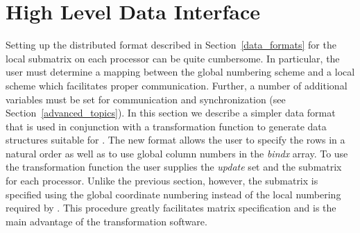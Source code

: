 \section{High Level Data Interface\label{highlevel_data_inter}}

Setting up the distributed format described in Section~\ref{data_formats} for
the local submatrix on each processor can be quite cumbersome. In particular,
the user must determine a mapping between the global numbering scheme and a
local scheme which facilitates proper communication.  Further, a number of
additional variables must be set for communication and synchronization (see
Section~\ref{advanced_topics}).  In this section we describe a simpler data
format that is used in conjunction with a transformation function to generate
data structures suitable for \Az{}.  The new format allows the user to specify
the rows in a natural order as well as to use global column numbers in the {\it
  bindx} array.  To use the transformation function the user supplies the {\it
  update\/} set and the submatrix for each processor.  Unlike the previous
section, however, the submatrix is specified using the global coordinate
numbering instead of the local numbering required by \Az{}. This procedure
greatly facilitates matrix specification and is the main advantage of the
transformation software.

